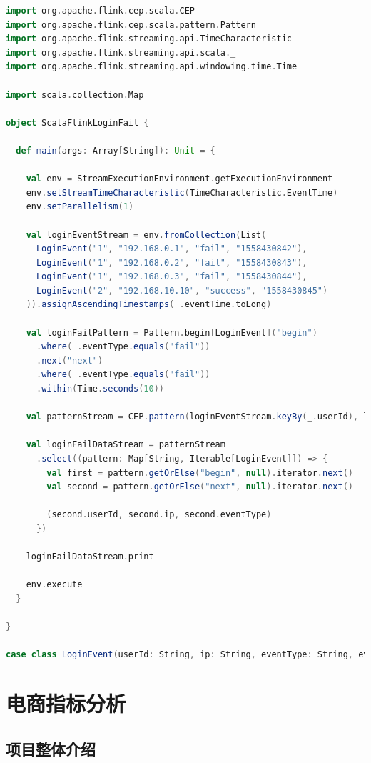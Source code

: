 \documentclass[oneside]{ctexbook}
\begin{document}
\begin{lstlisting}[language=scala]
import org.apache.flink.cep.scala.CEP
import org.apache.flink.cep.scala.pattern.Pattern
import org.apache.flink.streaming.api.TimeCharacteristic
import org.apache.flink.streaming.api.scala._
import org.apache.flink.streaming.api.windowing.time.Time

import scala.collection.Map

object ScalaFlinkLoginFail {

  def main(args: Array[String]): Unit = {

    val env = StreamExecutionEnvironment.getExecutionEnvironment
    env.setStreamTimeCharacteristic(TimeCharacteristic.EventTime)
    env.setParallelism(1)

    val loginEventStream = env.fromCollection(List(
      LoginEvent("1", "192.168.0.1", "fail", "1558430842"),
      LoginEvent("1", "192.168.0.2", "fail", "1558430843"),
      LoginEvent("1", "192.168.0.3", "fail", "1558430844"),
      LoginEvent("2", "192.168.10.10", "success", "1558430845")
    )).assignAscendingTimestamps(_.eventTime.toLong)

    val loginFailPattern = Pattern.begin[LoginEvent]("begin")
      .where(_.eventType.equals("fail"))
      .next("next")
      .where(_.eventType.equals("fail"))
      .within(Time.seconds(10))

    val patternStream = CEP.pattern(loginEventStream.keyBy(_.userId), loginFailPattern)

    val loginFailDataStream = patternStream
      .select((pattern: Map[String, Iterable[LoginEvent]]) => {
        val first = pattern.getOrElse("begin", null).iterator.next()
        val second = pattern.getOrElse("next", null).iterator.next()

        (second.userId, second.ip, second.eventType)
      })

    loginFailDataStream.print

    env.execute
  }

}

case class LoginEvent(userId: String, ip: String, eventType: String, eventTime: String)
\end{lstlisting}

\chapter{电商指标分析}

\section{项目整体介绍}
\end{document}
